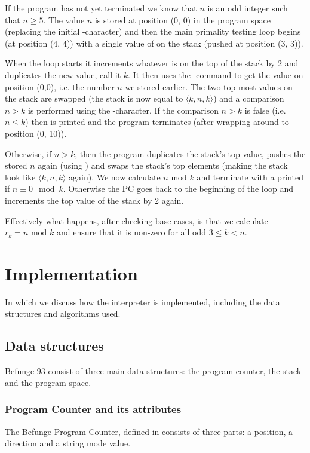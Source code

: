 \documentclass[12pt, a4paper]{article}
\begin{document}
If the program has not yet terminated we know that $n$ is an odd integer such that $n \geq 5$. The value $n$ is stored at position (0, 0) in the program space (replacing the initial \code{\&}-character) and then the main primality testing loop begins (at position (4, 4)) with a single value of  on the stack (pushed at position (3, 3)).

When the loop starts it increments whatever is on the top of the stack by 2 and duplicates the new value, call it $k$. It then uses the -command to get the value on position (0,0), i.e. the number $n$ we stored earlier. The two top-most values on the stack are swapped (the stack is now equal to $\langle k, n, k \rangle$) and a comparison $n > k$ is performed using the \code{\`{}}-character. If the comparison $n > k$ is false (i.e. $n \leq k$) then  is printed and the program terminates (after wrapping around to position (0, 10)).

Otherwise, if $n > k$, then the program duplicates the stack's top value, pushes the stored $n$ again (using ) and swaps the stack's top elements (making the stack look like $\langle k, n, k \rangle$ again). We now calculate $n \text{ mod } k$ and terminate with a printed  if $n \equiv 0 \mod k$. Otherwise the PC goes back to the beginning of the loop and increments the top value of the stack by 2 again.

Effectively what happens, after checking base cases, is that we calculate $r_k = n \text{ mod } k$ and ensure that it is non-zero for all odd $3 \leq k < n$.

\section{Implementation}
\label{sec:impl}

In which we discuss how the interpreter is implemented, including the data structures and algorithms used.

\subsection{Data structures}
\label{sec:structures}

Befunge-93 consist of three main data structures: the program counter, the stack and the program space.

\subsubsection{Program Counter and its attributes}
\label{sec:structprogramcounter}
The Befunge Program Counter, defined in  consists of three parts: a position, a direction and a string mode value.
\end{document}
